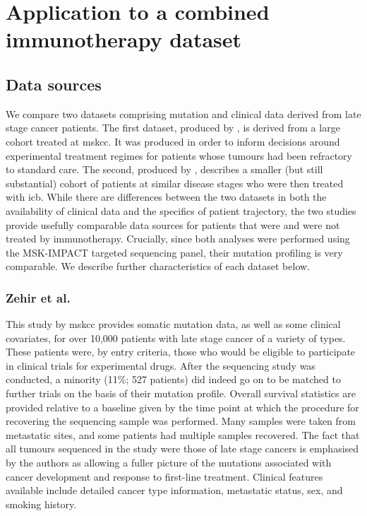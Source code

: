 \documentclass[../thesis.tex]{subfiles}
\begin{document}
\section{Application to a combined immunotherapy dataset \label{sec:immuno_hte}}

\subsection{Data sources}

We compare two datasets comprising mutation and clinical data derived from late stage cancer patients. The first dataset, produced by \citet{zehir_mutational_2017}, is derived from a large cohort treated at \gls{mskcc}. It was produced in order to inform decisions around experimental treatment regimes for patients whose tumours had been refractory to standard care. The second, produced by \citet{hellmann_genomic_2018}, describes a smaller (but still substantial) cohort of patients at similar disease stages who were then treated with \gls{icb}. While there are differences between the two datasets in both the availability of clinical data and the specifics of patient trajectory, the two studies provide usefully comparable data sources for patients that were and were not treated by immunotherapy. Crucially, since both analyses were performed using the MSK-IMPACT targeted sequencing panel, their mutation profiling is very comparable. We describe further characteristics of each dataset below. 

\subsubsection*{Zehir et al.}
This study by \gls{mskcc} provides somatic mutation data, as well as some clinical covariates, for over 10,000 patients with late stage cancer of a variety of types. These patients were, by entry criteria, those who would be eligible to participate in clinical trials for experimental drugs. After the sequencing study was conducted, a minority (11\%; 527 patients) did indeed go on to be matched to further trials on the basis of their mutation profile. Overall survival statistics are provided relative to a baseline given by the time point at which the procedure for recovering the sequencing sample was performed. Many samples were taken from metastatic sites, and some patients had multiple samples recovered. The fact that all tumours sequenced in the study were those of late stage cancers is emphasised by the authors as allowing a fuller picture of the mutations associated with cancer development and response to first-line treatment. Clinical features available include detailed cancer type information, metastatic status, sex, and smoking history.
\end{document}
